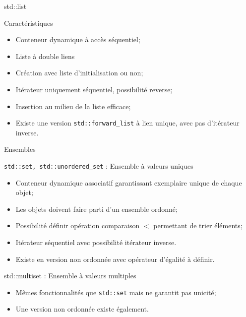 \documentclass[handout,10pt]{beamer}
\newcommand{\includepartcode}[4][cpp]{

}
\begin{document}
\begin{frame}[fragile]{std::list}
\tiny
\begin{block}{Caractéristiques}
\begin{itemize}
\item Conteneur dynamique à accès séquentiel;
\item Liste à double liens
\item Création avec liste d'initialisation ou non;
\item Itérateur uniquement séquentiel, possibilité reverse;
\item Insertion au milieu de la liste efficace;
\item Existe une version \lstinline$std::forward_list$ à lien unique, avec pas d'itérateur inverse.
\end{itemize}
\end{block}
\includepartcode{list.cpp}{4}{20}
\end{frame}

\begin{frame}[fragile]{Ensembles}
\tiny 
\begin{exampleblock}{\texttt{std::set, std::unordered\_set} : Ensemble à valeurs uniques}
\begin{itemize}
\item Conteneur dynamique associatif garantissant exemplaire unique de chaque objet;
\item Les objets doivent faire parti d'un ensemble ordonné;
\item Possibilité définir opération comparaison $<$ permettant de trier éléments;
\item Itérateur séquentiel avec possibilité itérateur inverse.
\item Existe en version non ordonnée avec opérateur d'égalité à définir.
\end{itemize}
\end{exampleblock}
\includepartcode{set.cpp}{7}{10}

\begin{exampleblock}{std::multiset : Ensemble à valeurs multiples}
\begin{itemize}
\item Mêmes fonctionnalités que \lstinline$std::set$ mais ne garantit pas unicité;
\item Une version non ordonnée existe également.
\end{itemize}
\end{exampleblock}
\end{frame}
\end{document}

